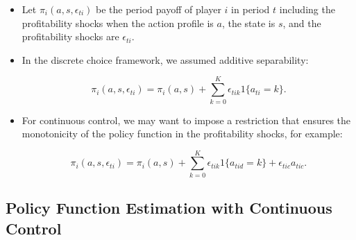 \documentclass[]{book}
\providecommand{\tightlist}{%
  \setlength{\itemsep}{0pt}\setlength{\parskip}{0pt}}
\begin{document}
\begin{itemize}
\tightlist
\item
  Let \(\pi_i(a, s, \epsilon_{ti})\) be the period payoff of player
  \(i\) in period \(t\) including the profitability shocks when the
  action profile is \(a\), the state is \(s\), and the profitability
  shocks are \(\epsilon_{ti}\).
\item
  In the discrete choice framework, we assumed additive separability:

  \begin{equation}
  \pi_i(a, s, \epsilon_{ti}) = \pi_i(a, s) + \sum_{k = 0}^K \epsilon_{tik}1\{a_{ti} = k\}.
  \end{equation}
\item
  For continuous control, we may want to impose a restriction that
  ensures the monotonicity of the policy function in the profitability
  shocks, for example:

  \begin{equation}
  \pi_i(a, s, \epsilon_{ti}) = \pi_i(a, s) + \sum_{k = 0}^K \epsilon_{tik} 1\{a_{tid} = k\} + \epsilon_{tic} a_{tic}.
  \end{equation}
\end{itemize}

\subsection{Policy Function Estimation with Continuous
Control}\label{policy-function-estimation-with-continuous-control}
\end{document}
